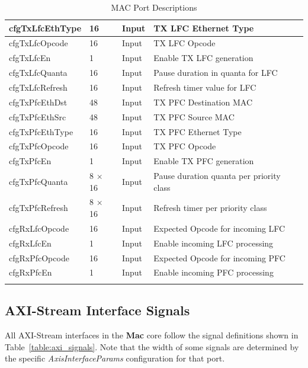 \begin{longtable}[H]{
    | p{}
    | p{}
    | p{}
    | p{} |
  }
  cfgTxLfcEthType         & 16        & Input  & TX LFC Ethernet Type \\ \hline
  cfgTxLfcOpcode          & 16        & Input  & TX LFC Opcode \\ \hline
  cfgTxLfcEn              & 1         & Input  & Enable TX LFC generation \\ \hline
  cfgTxLfcQuanta          & 16        & Input  & Pause duration in quanta for LFC \\ \hline
  cfgTxLfcRefresh         & 16        & Input  & Refresh timer value for LFC \\ \hline
  cfgTxPfcEthDst          & 48        & Input  & TX PFC Destination MAC \\ \hline
  cfgTxPfcEthSrc          & 48        & Input  & TX PFC Source MAC \\ \hline
  cfgTxPfcEthType         & 16        & Input  & TX PFC Ethernet Type \\ \hline
  cfgTxPfcOpcode          & 16        & Input  & TX PFC Opcode \\ \hline
  cfgTxPfcEn              & 1         & Input  & Enable TX PFC generation \\ \hline
  cfgTxPfcQuanta          & 8 $\times$ 16 & Input  & Pause duration quanta per priority class \\ \hline
  cfgTxPfcRefresh         & 8 $\times$ 16 & Input  & Refresh timer per priority class \\ \hline
  cfgRxLfcOpcode          & 16        & Input  & Expected Opcode for incoming LFC \\ \hline
  cfgRxLfcEn              & 1         & Input  & Enable incoming LFC processing \\ \hline
  cfgRxPfcOpcode          & 16        & Input  & Expected Opcode for incoming PFC \\ \hline
  cfgRxPfcEn              & 1         & Input  & Enable incoming PFC processing \\ \hline

  \caption{MAC Port Descriptions}\label{table:ports}
\end{longtable}


\subsection{AXI-Stream Interface Signals}
All AXI-Stream interfaces in the \textbf{Mac} core follow the signal definitions shown in Table~\ref{table:axi_signals}. 
Note that the width of some signals are determined by the specific \textit{AxisInterfaceParams} configuration for that port.

